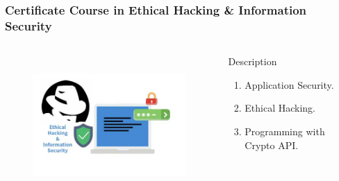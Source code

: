 \begin{frame}
	\frametitle{{\large Certificate Course in Ethical Hacking \& Information Security}}
		\begin{columns}
		
		
		\begin{figure}
			\includegraphics[width=200pt,height=150pt]{figures/course_ehis.jpg}
		\end{figure}
		
		
		\begin{block}{Description}
			
			\begin{enumerate}
				\item Application Security. 
				\item Ethical Hacking.
				\item Programming with Crypto API.
			\end{enumerate}
			
		\end{block}
		
	\end{columns}
\end{frame}
